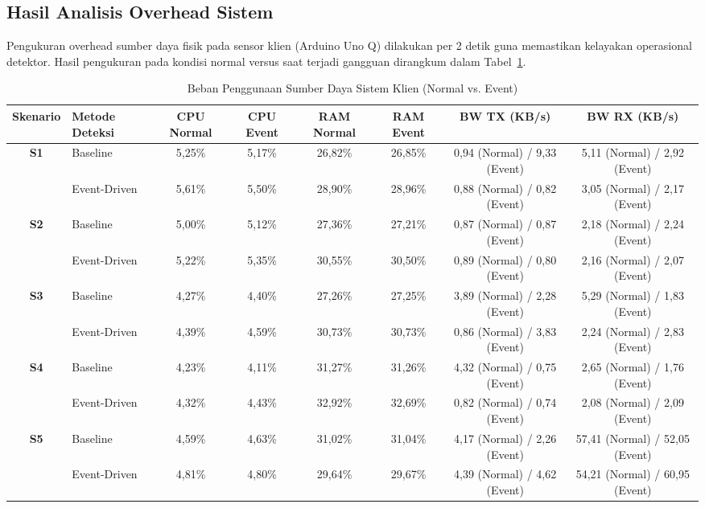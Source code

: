 \subsection{Hasil Analisis Overhead Sistem}
Pengukuran overhead sumber daya fisik pada sensor klien (Arduino Uno Q) dilakukan per 2 detik guna memastikan kelayakan operasional detektor. Hasil pengukuran pada kondisi normal versus saat terjadi gangguan dirangkum dalam Tabel~\ref{tab-overhead}.

\begin{table}[t]
\caption{Beban Penggunaan Sumber Daya Sistem Klien (Normal vs. Event)}
\label{tab-overhead}
\centering
\begin{tabular}{clcccccc}
\toprule
\textbf{Skenario} & \textbf{Metode Deteksi} & \textbf{CPU Normal} & \textbf{CPU Event} & \textbf{RAM Normal} & \textbf{RAM Event} & \textbf{BW TX (KB/s)} & \textbf{BW RX (KB/s)} \\
\midrule
\multirow{2}{*}{\textbf{S1}} & Baseline & 5,25\% & 5,17\% & 26,82\% & 26,85\% & 0,94 (Normal) / 9,33 (Event) & 5,11 (Normal) / 2,92 (Event) \\
 & Event-Driven & 5,61\% & 5,50\% & 28,90\% & 28,96\% & 0,88 (Normal) / 0,82 (Event) & 3,05 (Normal) / 2,17 (Event) \\
\hline
\multirow{2}{*}{\textbf{S2}} & Baseline & 5,00\% & 5,12\% & 27,36\% & 27,21\% & 0,87 (Normal) / 0,87 (Event) & 2,18 (Normal) / 2,24 (Event) \\
 & Event-Driven & 5,22\% & 5,35\% & 30,55\% & 30,50\% & 0,89 (Normal) / 0,80 (Event) & 2,16 (Normal) / 2,07 (Event) \\
\hline
\multirow{2}{*}{\textbf{S3}} & Baseline & 4,27\% & 4,40\% & 27,26\% & 27,25\% & 3,89 (Normal) / 2,28 (Event) & 5,29 (Normal) / 1,83 (Event) \\
 & Event-Driven & 4,39\% & 4,59\% & 30,73\% & 30,73\% & 0,86 (Normal) / 3,83 (Event) & 2,24 (Normal) / 2,83 (Event) \\
\hline
\multirow{2}{*}{\textbf{S4}} & Baseline & 4,23\% & 4,11\% & 31,27\% & 31,26\% & 4,32 (Normal) / 0,75 (Event) & 2,65 (Normal) / 1,76 (Event) \\
 & Event-Driven & 4,32\% & 4,43\% & 32,92\% & 32,69\% & 0,82 (Normal) / 0,74 (Event) & 2,08 (Normal) / 2,09 (Event) \\
\hline
\multirow{2}{*}{\textbf{S5}} & Baseline & 4,59\% & 4,63\% & 31,02\% & 31,04\% & 4,17 (Normal) / 2,26 (Event) & 57,41 (Normal) / 52,05 (Event) \\
 & Event-Driven & 4,81\% & 4,80\% & 29,64\% & 29,67\% & 4,39 (Normal) / 4,62 (Event) & 54,21 (Normal) / 60,95 (Event) \\

\end{tabular}
\end{table}
